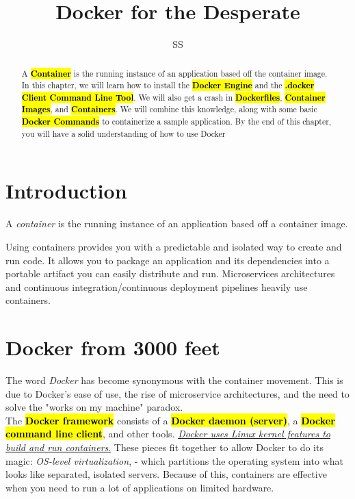 \documentclass{article}
\title{Docker for the Desperate}
\author{SS}
\begin{document}
\maketitle

\begin{abstract}
A \textbf{\textcolor{red}{\hl{Container}}} is the running instance of an application based off the container image. In this chapter, we will learn how to install the \textbf{\textcolor{red}{\hl{Docker Engine}}} and the \textbf{\textcolor{red}{\hl{.docker Client Command Line Tool}}}. We will also get a crash in \textbf{\textcolor{red}{\hl{Dockerfiles}}}, \textbf{\textcolor{red}{\hl{Container Images}}}, and \textbf{\textcolor{red}{\hl{Containers}}}. We will combine this knowledge, along with some basic \textbf{\textcolor{red}{\hl{Docker Commands}}} to containerize a sample application. By the end of this chapter, you will have a solid understanding of how to use Docker 
\end{abstract}

\section{Introduction}
\begin{tcolorbox}[colback=red!5!white, colframe=red!50!black,title=Container ] 
A \textit{container} is the running instance of an application based off a container image.
\end{tcolorbox}
Using containers provides you with a predictable and isolated way to create and run code. It allows you to package an application and its dependencies into a portable artifact you can easily distribute and run. Microservices architectures and continuous integration/continuous deployment pipelines heavily use containers. \\

\section{Docker from 3000 feet}
The word \textit{Docker} has become synonymous with the container movement. This is due to Docker's ease of use, the rise of microservice architectures, and the need to solve the "works on my machine" paradox. \\
The \textbf{\textcolor{red}{\hl{Docker framework}}} consists of a \textbf{\textcolor{red}{\hl{Docker daemon (server)}}}, a \textbf{\textcolor{red}{\hl{Docker command line client}}}, and other tools. \underline{ \textit{Docker uses Linux kernel features to build and run containers}.} These pieces fit together to allow Docker to do its magic: \textit{OS-level virtualization}, - which partitions the operating system into what looks like separated, isolated servers. Because of this, containers are effective when you need to run a lot of applications on limited hardware. 
\\
\end{document}
